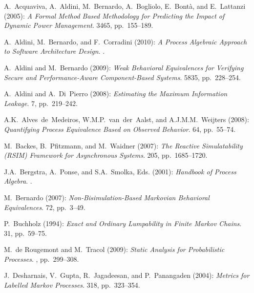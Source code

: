 \documentclass[copyright,creativecommons]{eptcs}
\begin{document}
 \begin{thebibliography}{1}

A.~Acquaviva, A.~Aldini, M.~Bernardo, A.~Bogliolo, E.~Bont\`a, and E.~Lattanzi (2005):
\newblock \emph{A Formal Method Based Methodology for Predicting the Impact of Dynamic Power Management}.
 3465, pp.~155--189. 

A.~Aldini, M.~Bernardo, and F.~Corradini (2010):
\newblock \emph{A Process Algebraic Approach to Software Architecture Design}.
.

A.~Aldini and M.~Bernardo (2009):
\newblock \emph{Weak Behavioral Equivalences for Verifying Secure and Performance-Aware Component-Based Systems}.
 5835, pp.~228--254. 

A.~Aldini and A.~Di~Pierro (2008):
\newblock \emph{Estimating the Maximum Information Leakage}.
 7, pp.~219--242. 

A.K.~Alves~de~Medeiros, W.M.P.~van~der~Aalst, and A.J.M.M.~Weijters (2008):
\newblock \emph{Quantifying Process Equivalence Based on Observed Behavior}.
 64, pp.~55--74.

M.~Backes, B.~Pfitzmann, and M.~Waidner (2007):
\newblock \emph{The Reactive Simulatability (RSIM) Framework for Asynchronous Systems}.
 205, pp.~1685--1720.

J.A.~Bergstra, A.~Ponse, and S.A.~Smolka, Eds. (2001):
\newblock \emph{Handbook of Process Algebra}.
.

M.~Bernardo (2007):
\newblock \emph{Non-Bisimulation-Based Markovian Behavioral Equivalences}.
 72, pp.~3--49.

 P.~Buchholz (1994):
\newblock \emph{Exact and Ordinary Lumpability in Finite Markov Chains}.
 31, pp.~59--75.

M.~de Rougemont and M.~Tracol (2009):
\newblock \emph{Static Analysis for Probabilistic Processes}.
, pp.~299--308.

J.~Desharnais, V.~Gupta, R.~Jagadeesan, and P.~Panangaden (2004):
\newblock \emph{Metrics for Labelled Markov Processes}.
 318, pp.~323--354.


\end{thebibliography}
\end{document}
